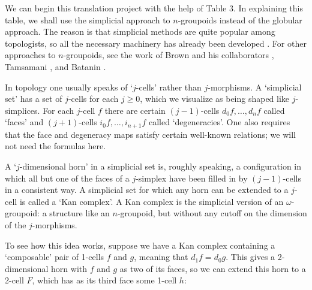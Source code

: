 We can begin this translation project with the help of Table 3.  In
explaining this table, we shall use the simplicial approach to
$n$-groupoids instead of the globular approach.  The reason is that
simplicial methods are quite popular among topologists, so all the
necessary machinery has already been developed \cite{May}.  For other
approaches to $n$-groupoids, see the work of Brown and his collaborators
\cite{Brown}, Tamsamani \cite{Tamsamani2}, and Batanin \cite{Batanin}.  

In topology one usually speaks of `$j$-cells' rather than $j$-morphisms.
A `simplicial set' has a set of $j$-cells for each $j \ge 0$, which we
visualize as being shaped like $j$-simplices.  For each $j$-cell $f$
there are certain $(j-1)$-cells $d_0f, \dots, d_nf$ called `faces' and
$(j+1)$-cells $i_0f, \dots, i_{n+1}f$ called `degeneracies'.   One also
requires that the face and degeneracy maps satisfy certain well-known 
relations; we will not need the formulas here. 

A `$j$-dimensional horn' in a simplicial set is, roughly speaking, a
configuration in which all but one of the faces of a $j$-simplex have
been filled in by $(j-1)$-cells in a consistent way.  A simplicial set
for which any horn can be extended to a $j$-cell is called a `Kan
complex'.   A Kan complex is the simplicial version of an
$\omega$-groupoid: a structure like an $n$-groupoid, but without any
cutoff on the dimension of the $j$-morphisms.  

To see how this idea works, suppose we have a Kan complex containing
a `composable' pair of 1-cells $f$ and $g$, meaning that $d_1 f = d_0 g$.
This gives a 2-dimensional horn with $f$ and $g$ as two of its faces, so
we can extend this horn to a 2-cell $F$, which has as its third face
some 1-cell $h$:

